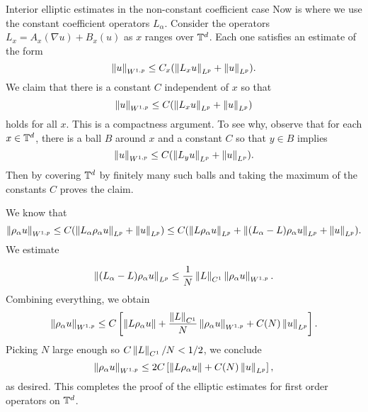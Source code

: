 \begin{clear}{Interior elliptic estimates in the non-constant
    coefficient case}
Now is where we use the constant coefficient operators $L_{\alpha}$. Consider the operators $L_{x}=A_{x}(\nabla u)+B_{x}(u)$ as $x$ ranges over $\mathbb{T}^{d}$. Each one satisfies an estimate of the form
\begin{equation*}
  \left\lVert u\right\rVert_{W^{1,p}}\le C_{x}(\left\lVert L_{x}u\right\rVert_{L^{p}}+\left\lVert u\right\rVert_{L^{p}}).
\end{equation*}
We claim that there is a constant $C$ independent of $x$ so that
\begin{equation*}
  \left\lVert u\right\rVert_{W^{1,p}}\le C(\left\lVert L_{x}u\right\rVert_{L^{p}}+\left\lVert u\right\rVert_{L^{p}})
\end{equation*}
holds for all $x$. This is a compactness argument. To see why, observe that for each $x\in \mathbb{T}^{d}$, there is a ball $B$ around $x$ and a constant $C$ so that $y\in B$ implies
\begin{equation*}
  \left\lVert u\right\rVert_{W^{1,p}}\le C(\left\lVert L_{y}u\right\rVert_{L^{p}}+\left\lVert u\right\rVert_{L^{p}}).
\end{equation*}
Then by covering $\mathbb{T}^{d}$ by finitely many such balls and taking the maximum of the constants $C$ proves the claim.

We know that
\begin{equation*}
  \left\lVert\rho_{\alpha}u\right\rVert_{W^{1,p}}\le C(\left\lVert L_{\alpha}\rho_{\alpha}u\right\rVert_{L^{p}}+\left\lVert u\right\rVert_{L^{p}})\le C(\left\lVert L\rho_{\alpha}u\right\rVert_{L^{p}}+\left\lVert(L_{\alpha}-L)\rho_{\alpha}u\right\rVert_{L^{p}}+\left\lVert u\right\rVert_{L^{p}}).
\end{equation*}
We estimate

\begin{equation*}
  \begin{aligned}
    \left\lVert(L_{\alpha}-L)\rho_{\alpha}u\right\rVert_{L^{p}}\le \frac{1}{N}\left\lVert L\right\rVert_{C^{1}}\left\lVert\rho_{\alpha}u\right\rVert_{W^{1,p}}.
  \end{aligned}
\end{equation*}
Combining everything, we obtain
\begin{equation*}
  \left\lVert\rho_{\alpha}u\right\rVert_{W^{1,p}}\le C\left[\left\lVert L\rho_{\alpha}u\right\rVert+\frac{\left\lVert L\right\rVert_{C^{1}}}{N}\left\lVert\rho_{\alpha}u\right\rVert_{W^{1,p}}+C(N)\left\lVert u\right\rVert_{L^{p}}\right].
\end{equation*}
Picking $N$ large enough so $C\left\lVert L\right\rVert_{C^{1}}/N<1/2$, we conclude
\begin{equation*}
  \left\lVert\rho_{\alpha}u\right\rVert_{W^{1,p}}\le 2C\left[\left\lVert L\rho_{\alpha}u\right\rVert+C(N)\left\lVert u\right\rVert_{L^{p}}\right],
\end{equation*}
as desired. This completes the proof of the elliptic estimates for
first order operators on $\mathbb{T}^{d}$.
\end{clear}

